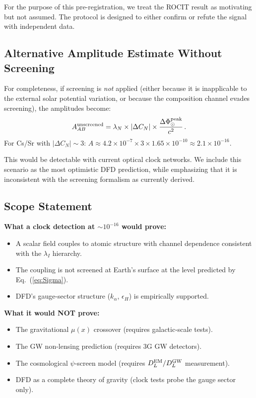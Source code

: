 \documentclass[twocolumn,showpacs,preprintnumbers,amsmath,amssymb,prd]{revtex4-2}
\newcommand{\kalpha}{k_\alpha}
\begin{document}
For the purpose of this pre-registration, we treat the ROCIT
result as motivating but not assumed.  The protocol is designed
to either confirm or refute the signal with independent data.

\subsection{Alternative Amplitude Estimate Without Screening}
\label{sec:unscreened}

For completeness, if screening is \emph{not} applied (either
because it is inapplicable to the external solar potential
variation, or because the composition channel evades screening),
the amplitudes become:
\begin{equation}\label{eq:unscreened-amp}
A_{AB}^{\rm unscreened}
= \lambda_N \times |\Delta C_N| \times
  \frac{\Delta\Phi_\odot^{\rm peak}}{c^2}\,.
\end{equation}
For Cs/Sr with $|\Delta C_N| \sim 3$:
$A \approx 4.2 \times 10^{-7} \times 3 \times 1.65 \times 10^{-10}
\approx 2.1 \times 10^{-16}$.

This would be detectable with current optical clock networks.
We include this scenario as the most optimistic DFD prediction,
while emphasizing that it is inconsistent with the screening
formalism as currently derived.

\subsection{Scope Statement}\label{sec:scope}

\textbf{What a clock detection at $\sim 10^{-16}$ would prove:}
\begin{itemize}
\item A scalar field couples to atomic structure with channel
  dependence consistent with the $\lambda_I$ hierarchy.
\item The coupling is not screened at Earth's surface at the level
  predicted by Eq.~(\ref{eq:Sigma}).
\item DFD's gauge-sector structure ($\kalpha$, $\epsilon_H$) is
  empirically supported.
\end{itemize}

\textbf{What it would NOT prove:}
\begin{itemize}
\item The gravitational $\mu(x)$ crossover (requires galactic-scale
  tests).
\item The GW non-lensing prediction (requires 3G GW detectors).
\item The cosmological $\psi$-screen model (requires
  $D_L^{\rm EM}/D_L^{\rm GW}$ measurement).
\item DFD as a complete theory of gravity (clock tests probe the
  gauge sector only).
\end{itemize}
\end{document}
